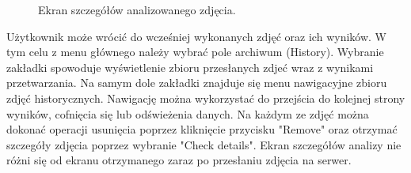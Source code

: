 {	
\begin{figure}[ht]
	\centering
	\quad
	\caption{Ekran szczegółów analizowanego zdjęcia.}
	\label{fig:uploadView}
\end{figure}

Użytkownik może wrócić do wcześniej wykonanych zdjęć oraz ich wyników. W tym celu z menu głównego należy wybrać pole archiwum (History). Wybranie zakładki spowoduje wyświetlenie zbioru przesłanych zdjeć wraz z wynikami przetwarzania. Na samym dole zakładki znajduje się menu nawigacyjne zbioru zdjęć historycznych. Nawigację można wykorzystać do przejścia do kolejnej strony wyników, cofnięcia się lub odświeżenia danych. Na każdym ze zdjęć można dokonać operacji usunięcia poprzez kliknięcie przycisku "Remove" oraz otrzymać szczegóły zdjęcia poprzez wybranie "Check details". Ekran szczegółów analizy nie różni się od ekranu otrzymanego zaraz po przesłaniu zdjęcia na serwer. 

}
